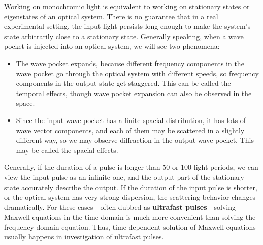 \documentclass[hyperref, a4paper]{article}
\newcommand*{\concept}[1]{{\textbf{#1}}}
\begin{document}
\begin{note*}{}{}
    Working on monochromic light is equivalent to working on stationary states or eigenstates of an optical system.
    There is no guarantee that in a real experimental setting, the input light persists long enough 
    to make the system's state arbitrarily close to a stationary state.
    Generally speaking, when a wave pocket is injected into an optical system, 
    we will see two phenomena: 
    \begin{itemize}
        \item The wave pocket expands, because different frequency components in the wave pocket go through
        the optical system with different speeds, so frequency components in the output state get staggered.
        This can be called the temporal effects, though wave pocket expansion can also be observed in the space.
        \item Since the input wave pocket has a finite spacial distribution, it has lots of wave vector
        components, and each of them may be scattered in a slightly different way, so we may observe 
        diffraction in the output wave pocket. This may be called the spacial effects. 
    \end{itemize}
    Generally, if the duration of a pulse is longer than 50 or 100 light periods, we can view the input 
    pulse as an infinite one, and the output part of the stationary state accurately describe the output.
    If the duration of the input pulse is shorter, or the optical system has very strong dispersion,
    the scattering behavior changes dramatically.
    For these cases - often dubbed as \concept{ultrafast pulses} - solving Maxwell equations in the time 
    domain is much more convenient than solving the frequency domain equation.
    Thus, time-dependent solution of Maxwell equations usually happens in investigation of ultrafast pulses.
\end{note*}
\end{document}
